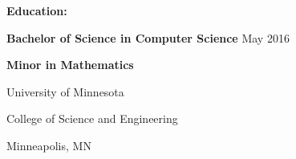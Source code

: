 {\large\noindent
\textbf{Education:}}

{\indent
\textbf{Bachelor of Science in Computer Science} \hfill May 2016

\textbf{Minor in Mathematics}

University of Minnesota

College of Science and Engineering

Minneapolis, MN}

\begin{comment}
\indent
Galesville-Ettrick-Trempealeau High School
\hfill
September 2005 - June 2009

\indent
Galesville, WI
\end{comment}